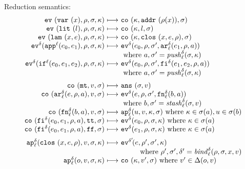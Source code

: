\documentclass{llncs}
\begin{document}
Reduction semantics:
\begin{gather*}
\begin{array}{@{}r@{\ }c@{\ }l@{}}
\ev{\svar\mvar,\menv,\msto,\mkont} &\machstep&
\co{\mkont,\saddr{\menv(\mvar)},\msto}
\\
\ev{\slit\mlit,\menv,\msto,\mkont} &\machstep&
\co{\mkont,\mlit,\msto}
\\
\ev{\slam\mvar\mexp,\menv,\msto,\mkont} &\machstep&
\co{\mkont,\clos{\mvar,\mexp,\menv},\msto}
\\
\ev[^\mcntr]{\sapp[^\mlab]{\mexpi0}{\mexpi1},\menv,\msto,\mkont} &\machstep&
\ev[^\mcntr]{\mexpi{0},\menv,\msto',\kar[_\mlab^\mcntr]{\mexpi{1},\menv,\maddr}}
\\
&&
\text{ where }\maddr,\msto' = \push^\mcntr_\mlab(\msto,\mkont)
\\
\ev[^\mcntr]{\sif[^\mlab]{\mexpi0}{\mexpi1}{\mexpi2},\menv,\msto,\mkont} &\machstep&
\ev[^\mcntr]{\mexpi0,\menv,\msto',\kif[^\mcntr]{\mexpi1,\mexpi2,\menv,\maddr}}
\\
&&
\text{ where }\maddr,\msto' = \push_\mlab^\mcntr(\msto,\mkont)
\\[2mm]
\co{\kmt,\mval,\msto} &\machstep&
\ans{\msto,\mval}
\\
\co{\kar[^\mcntr_\mlab]{\mexp,\menv,\maddr},\mval,\msto} & \machstep&
\ev[^\mcntr]{\mexp,\menv,\msto',\kfn[^\mcntr_\mlab]{\maddralt,\maddr}}
\\
&&
\text{ where }\maddralt,\msto' = \stash_\mlab^\mcntr(\msto,\mval)
\\
\co{\kfn[^\mcntr_\mlab]{\maddralt,\maddr},\mval,\msto} & \machstep&
\ap[^\mcntr_\mlab]{\mvalx{u},\mval,\mkont,\msto}
\text{ where } \mkont \in \msto(\maddr), \mvalx{u} \in \msto(\maddralt)
\\
\co{\kif[^\mcntr]{\mexpi0,\mexpi1,\menv,\maddr},\strue,\msto} & \machstep&
\ev[^\mcntr]{\mexpi0,\menv,\msto,\mkont}
\text{ where }\mkont\in\msto(\maddr)
\\
\co{\kif[^\mcntr]{\mexpi0,\mexpi1,\menv,\maddr},\sfalse,\msto} & \machstep&
\ev[^\mcntr]{\mexpi1,\menv,\msto,\mkont}
\text{ where }\mkont\in\msto(\maddr)
\\[2mm]
\ap[^\mcntr_\mlab]{\clos{\mvar,\mexp,\menv},\mval,\msto,\mkont} & \machstep&
\ev[^{\mcntr'}\!]{\mexp,\menv',\msto',\mkont}
\\
\multicolumn{3}{r@{}}{
\text{ where }\menv',\msto',\mcntr' = \bind^{ \mcntr}_\mlab(\menv,\msto,\mvar,\mval)}
\\
\ap[^\mcntr_\mlab]{\mop,\mval,\msto,\mkont} & \machstep&
\co{\mkont,\mval',\msto}
\text{ where } \mval'\in\interpdelta(\mop,\mval)
\end{array}
\end{gather*}
\end{document}
